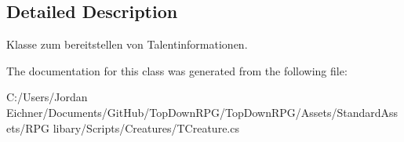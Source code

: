 \subsection{Detailed Description}
Klasse zum bereitstellen von Talentinformationen. 

The documentation for this class was generated from the following file\+:\begin{DoxyCompactItemize}
\item 
C\+:/\+Users/\+Jordan Eichner/\+Documents/\+Git\+Hub/\+Top\+Down\+R\+P\+G/\+Top\+Down\+R\+P\+G/\+Assets/\+Standard\+Assets/\+R\+P\+G libary/\+Scripts/\+Creatures/T\+Creature.\+cs\end{DoxyCompactItemize}
